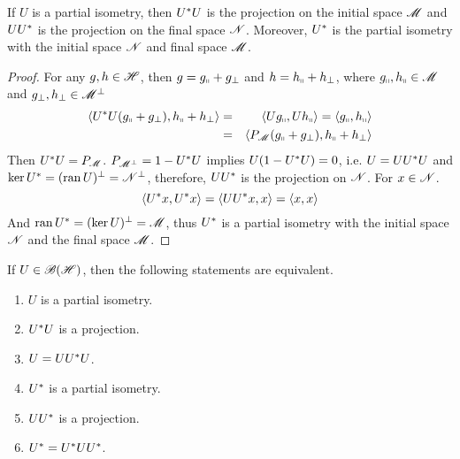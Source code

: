 \documentclass[a4paper,11pt]{report}
\begin{document}
\begin{prop}
	If $U$ is a partial isometry, then $U^{*}U$ is the projection on the initial space $\mathscr{M}$ and $UU^{*}$ is the projection on the final space $\mathscr{N}$. Moreover, $U^{*}$ is the partial isometry with the initial space $\mathscr{N}$ and final space $\mathscr{M}$.
\end{prop}
\begin{proof}
	For any $g,h \in \mathscr{H}$, then $g = g_{\shortparallel} + g_{\bot}$ and $h = h_{\shortparallel} + h_{\bot}$, where $g_{\shortparallel},h_{\shortparallel} \in \mathscr{M}$ and $g_{\bot},h_{\bot} \in \mathscr{M}^{\bot}$
	\begin{eqnarray*}
		\langle U^{*}U(g_{\shortparallel} + g_{\bot}), h_{\shortparallel} + h_{\bot} \rangle &=& \langle Ug_{\shortparallel},Uh_{\shortparallel} \rangle = \langle g_{\shortparallel},h_{\shortparallel} \rangle \\
		&=& \langle P_{\mathscr{M}}(g_{\shortparallel} + g_{\bot}),h_{\shortparallel} + h_{\bot} \rangle
	\end{eqnarray*}
	Then $U^{*}U = P_{\mathscr{M}}$. $P_{\mathscr{M}^{\bot}} = 1-U^{*}U$ implies $U(1-U^{*}U) = 0$, i.e. $U = UU^{*}U$ and $\ker{U^{*}} = (\operatorname{ran}{U})^{\bot} = \mathscr{N}^{\bot}$, therefore, $UU^{*}$ is the projection on $\mathscr{N}$. For $x \in \mathscr{N}$.
	\begin{equation}
		\langle U^{*}x, U^{*}x \rangle = \langle UU^{*}x, x \rangle = \langle x, x \rangle
	\end{equation}
	And $\operatorname{ran}{U^{*}} = (\ker{U})^{\bot} = \mathscr{M}$, thus $U^{*}$ is a partial isometry with the initial space $\mathscr{N}$ and the final space $\mathscr{M}$.
\end{proof}

\begin{cor}
	If $U \in \mathscr{B(H)}$, then the following statements are equivalent.
	\begin{enumerate}[label=\arabic*)]
		\item $U$ is a partial isometry.
		\item $U^{*}U$ is a projection.
		\item $U = UU^{*}U$.
		\item $U^{*}$ is a partial isometry.
		\item $UU^{*}$ is a projection.
		\item $U^{*} = U^{*}UU^{*}$.
	\end{enumerate}
\end{cor}
\end{document}
